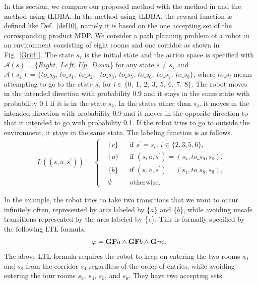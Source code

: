 \documentclass[letterpaper, 10 pt, conference]{ieeeconf}  %
\begin{document}
In this section, we compare our proposed method with the method in \cite{HAK2019,HKAKPL2019} and the method using tLDBA. In the method using tLDBA, the reward function is defined like Def.\ \ref{def10}, namely it is based on the one accepting set of the corresponding product MDP.
We consider a path planning problem of a robot in an environment consisting of eight rooms and one corridor as shown in Fig.\ \ref{Grid1}. The state $s_7$ is the initial state and the action space is specified with $\mathcal{A}(s) = \{ Right,\ Left,\ Up,\ Down \}$ for any state $s \neq s_4$ and $\mathcal{A}(s_4) = \{ to\_s_0,\ to\_s_1,\ to\_s_2,$ $\ to\_s_3,\ to\_s_5,\ to\_s_6,\ to\_s_7,\ to\_s_8 \}$, where $to\_s_i$ means attempting to go to the state $s_i$ for $i \in \{0,\ 1,\ 2,\ 3,\ 5,\ 6,\ 7,\ 8 \}$. The robot moves in the intended direction with probability 0.9 and it stays in the same state with probability 0.1 if it is in the state $s_4$. In the states other than $s_4$, it moves in the intended direction with probability 0.9 and it moves in the opposite direction to that it intended to go with probability 0.1. If the robot tries to go to outside the environment, it stays in the same state. The labeling function is as follows.
\begin{align*}
      & L((s, a, s^{\prime})) =
      \left\{
      \begin{aligned}
        & \{ c \} &  & \text{if }s^{\prime} = s_i,\ i \in \{ 2,3,5,6 \}, \nonumber \\
        & \{ a \} &  & \text{if }(s,a,s^{\prime})=(s_4,to\_s_0,s_0), \nonumber \\
        & \{ b \} &  & \text{if }(s,a,s^{\prime})=(s_4,to\_s_8, s_8), \nonumber \\
        & \emptyset &  & \text{otherwise}.
      \end{aligned}
      \right.
    \end{align*}

In the example, the robot tries to take two transitions that we want to occur infinitely often, represented by arcs labeled by \{$a$\} and \{$b$\}, while avoiding unsafe transitions represented by the arcs labeled by \{{\it c}\}. This is formally specified by the following LTL formula.
\begin{align*}
  \varphi = \text{{\bf GF}}a \wedge \text{{\bf GF}}b \wedge \text{{\bf G}}\neg c.
\end{align*}
The above LTL formula requires the robot to keep on entering the two rooms $s_0$ and $s_8$ from the corridor $s_4$ regardless of the order of entries, while avoiding entering the four rooms $s_2$, $s_3$, $s_5$, and $s_6$. They have two accepting sets.
\end{document}

